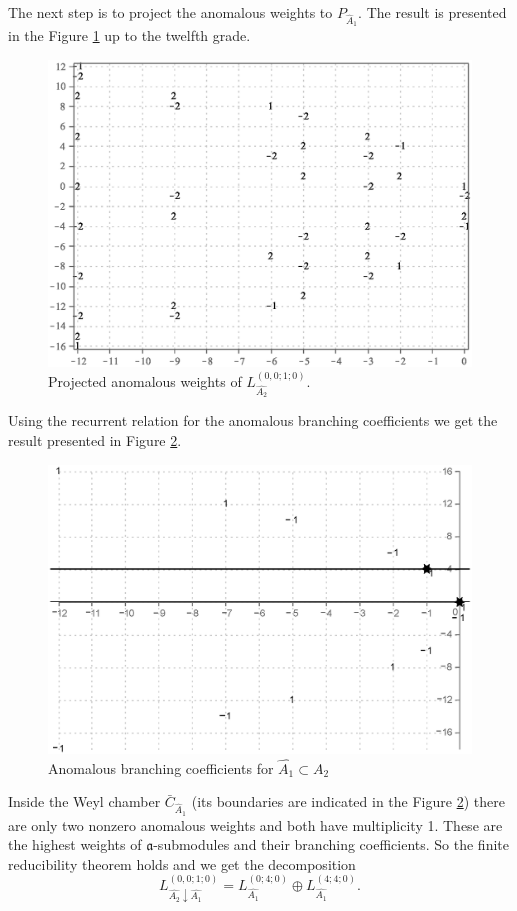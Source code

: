 \documentclass[12pt]{iopart}
\theoremstyle{definition}
\theoremstyle{definition}
\theoremstyle{definition}
\begin{document}
The next step is to project the anomalous weights to $P_{\hat A_1}$.
The result is presented in the Figure \ref{fig:AffineA2_A1_anom_proj} up to the twelfth grade.
\begin{figure}[h!tb]
  \centering
  \includegraphics[width=130mm]{figure8.eps}
  \caption{Projected anomalous weights of $L^{(0,0;1;0)}_{\hat{A_2}}$.}
  \label{fig:AffineA2_A1_anom_proj}
\end{figure}


Using the recurrent relation for the anomalous branching coefficients
we get the result presented in Figure \ref{fig:AffineA2_A1_branching}.
\begin{figure}[h!tb]
  \centering
  \includegraphics[width=130mm]{figure9.eps}
  \caption{Anomalous branching coefficients for $\hat{A_1}\subset \hat{A_2}$}
  \label{fig:AffineA2_A1_branching}
\end{figure}
Inside the Weyl chamber $\bar{C}_{\hat{A}_1}$
(its boundaries are indicated in the Figure \ref{fig:AffineA2_A1_branching})
there are only two nonzero anomalous weights and both have multiplicity 1.
These are the highest weights of $\mathfrak{a}$-submodules and their branching
coefficients. So the finite reducibility theorem holds and we get the decomposition
\begin{equation*}
  \label{eq:43}
  L^{(0,0;1;0)}_{\hat{A_2}\downarrow \hat{A_1}}= L_{\hat{A_1}}^{(0;4;0)}\oplus L_{\hat{A_1}}^{(4;4;0)}.
\end{equation*}
\end{document}
